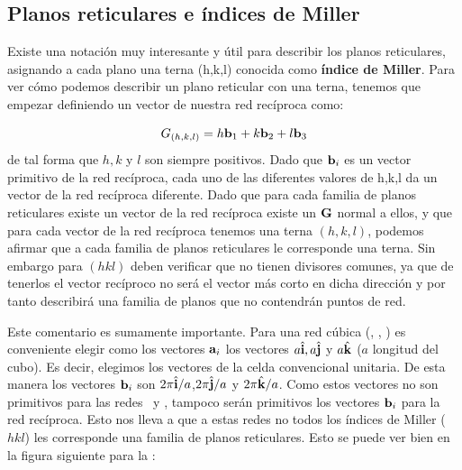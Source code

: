 \subsection{Planos reticulares e índices de Miller}

Existe una notación muy interesante y útil para describir los planos reticulares, asignando a cada plano una terna (h,k,l) conocida como \textbf{índice de Miller}. Para ver cómo podemos describir un plano reticular con una terna, tenemos que empezar definiendo un vector de nuestra red recíproca como:

\begin{equation}
	G_{(h,k,l)} = h \mathbf{b}_1 + k\mathbf{b}_2 + l \mathbf{b}_3
\end{equation}
de tal forma que $h,k$ y $l$ son siempre positivos. Dado que $\mathbf{b}_i$ es un vector primitivo de la red recíproca, cada uno de las diferentes valores de h,k,l da un vector de la red recíproca diferente. Dado que para cada familia de planos reticulares existe un vector de la red recíproca existe un $\mathbf{G}$ normal a ellos, y que para cada vector de la red recíproca tenemos una terna $(h,k,l)$, podemos afirmar que a cada familia de planos reticulares le corresponde una terna. Sin embargo para $(hkl)$ deben verificar que no tienen divisores comunes, ya que de tenerlos el vector recíproco no será el vector más corto en dicha dirección y por tanto describirá una familia de planos que no contendrán puntos de red.

Este comentario es sumamente importante. Para una red cúbica (\sc, \fcc, \bcc) es conveniente elegir como los vectores $\mathbf{a}_i$ los vectores $a\hat{\mathbf{i}},a\hat{\mathbf{j}}$ y $a\hat{\mathbf{k}}$ ($a$ longitud del cubo). Es decir, elegimos los vectores de la celda convencional unitaria. De esta manera los vectores $\mathbf{b}_i$ son $2\pi\hat{\mathbf{i}}/a$,$2\pi\hat{\mathbf{j}}/a$ y $2\pi\hat{\mathbf{k}}/a$. Como estos vectores no son primitivos para las redes \fcc \ y \bcc, tampoco serán primitivos los vectores $\mathbf{b}_i$ para la red recíproca. Esto nos lleva a que a estas redes no todos los índices de Miller ($hkl$) les corresponde una familia de planos reticulares. Esto se puede ver bien en la figura siguiente para la \bcc:

